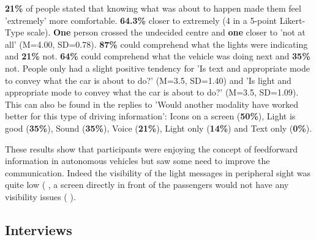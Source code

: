 \textbf{21\%} of people stated that knowing what was about to happen made them feel 'extremely' more comfortable. \textbf{64.3\%} closer to extremely (4 in a 5-point Likert-Type scale). \textbf{One} person crossed the undecided centre and \textbf{one} closer to 'not at all' (M=4.00, SD=0.78). \textbf{87\%} could comprehend what the lights were indicating and \textbf{21\%} not. \textbf{64\%} could comprehend what the vehicle was doing next and \textbf{35\%} not. People only had a slight positive tendency for 'Is text and appropriate mode to convey what the car is about to do?' (M=3.5, SD=1.40) and  'Is light and appropriate mode to convey what the car is about to do?' (M=3.5, SD=1.09). This can also be found in the replies to 'Would another modality have worked better for this type of driving information': Icons on a screen (\textbf{50\%}), Light is good (\textbf{35\%}), Sound (\textbf{35\%}), Voice (\textbf{21\%}), Light only (\textbf{14\%}) and Text only (\textbf{0\%}). 

These results show that participants were enjoying the concept of feedforward information in autonomous vehicles but saw some need to improve the communication. Indeed the visibility of the light messages in peripheral sight was quite low ( , a screen directly in front of the passengers would not have any visibility issues ( ).

\subsection{Interviews}
\label{ssec:interviews}

